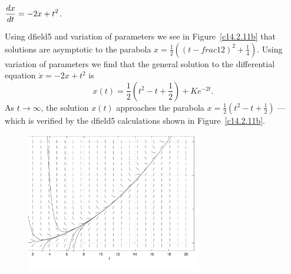 \documentclass{ximera}
\begin{document}
\begin{computerExercise}   \label{c14.2.11b}
$\displaystyle\frac{dx}{dt} = -2 x + t^2$.

\begin{solution}
Using {\sf dfield5} and variation of parameters we see in 
Figure~\ref{c14.2.11b} that solutions are asymptotic to the
parabola $x=\frac{1}{2}((t-frac{1}{2})^2+\frac{1}{4})$.
Using variation of parameters we find that the general solution to the
differential equation $\dot{x}=-2x+t^2$ is 
\[
x(t) = \frac{1}{2}\left(t^2-t+\frac{1}{2}\right) + Ke^{-2t}.
\]
As $t\to\infty$, the solution $x(t)$ approaches the parabola  
$x= \frac{1}{2}(t^2-t+\frac{1}{2})$ --- which is verified by the 
{\sf dfield5} calculations shown in Figure~\ref{c14.2.11b}.

\begin{figure}[htb]
     \centerline{%
     \includegraphics[width=3.0in]{exfigure/fig17-1-12.pdf}}
\end{figure} 

\end{solution}
\end{computerExercise}
\end{document}
